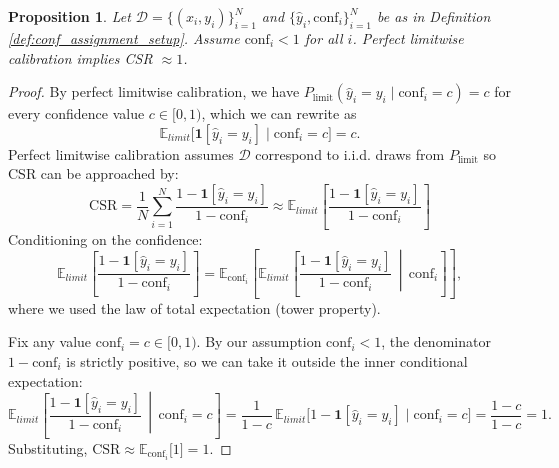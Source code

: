 \documentclass[10pt,a4paper]{amsart}
\newtheorem{theorem}{Proposition}
\begin{document}
\begin{theorem} \label{theorem:PerfectCal_is_CSR_one_limitwise}
Let $\mathcal{D} = \{(x_i, y_i)\}_{i=1}^N$ and $\{\hat{y}_i, \text{conf}_i\}_{i=1}^N$ be as in Definition \ref{def:conf_assignment_setup}. Assume $\text{conf}_i < 1$ for all $i$. Perfect limitwise calibration implies CSR $ \approx 1$.
\end{theorem}

\begin{proof}
By perfect limitwise calibration, we have $P_{\text{limit}}(\hat{y}_i = y_i \mid \text{conf}_i = c) = c$  for every confidence value $c \in [0,1)$, which we can rewrite as
\[
\mathbb{E}_{limit}\big[\mathbf{1}[\hat{y}_i = y_i] \mid \text{conf}_i = c\big] = c.
\]
Perfect limitwise calibration assumes $\mathcal{D}$ correspond to i.i.d. draws from $P_{\text{limit}}$ so CSR can be approached by:
\[
\text{CSR} = \frac{1}{N}\sum_{i=1}^N \frac{1 - \mathbf{1}[\hat{y}_i = y_i]}{1 - \text{conf}_i} \approx \mathbb{E}_{limit}\left[\frac{1 - \mathbf{1}[\hat{y}_i = y_i]}{1 - \text{conf}_i}\right] 
\]
Conditioning on the confidence:
\[
\mathbb{E}_{limit}\left[\frac{1 - \mathbf{1}[\hat{y}_i = y_i]}{1 - \text{conf}_i}\right] = \mathbb{E}_{\text{conf}_i}\left[   \mathbb{E}_{limit}\left[\frac{1 - \mathbf{1}[\hat{y}_i = y_i]}{1 - \text{conf}_i}  \,\middle|\, \text{conf}_i\right] \right],
\]
where we used the law of total expectation (tower property).

Fix any value $\text{conf}_i = c \in [0,1)$.
By our assumption $\text{conf}_i < 1$, the denominator $1 - \text{conf}_i$ is strictly positive, so we can take it outside the inner conditional expectation:
\[
\mathbb{E}_{limit}\left[\frac{1 - \mathbf{1}[\hat{y}_i = y_i]}{1 - \text{conf}_i}
\,\middle|\, \text{conf}_i = c\right]
= 
\frac{1}{1 - c}\,
\mathbb{E}_{limit}\big[1 - \mathbf{1}[\hat{y}_i = y_i] \mid \text{conf}_i = c\big]
= \frac{1 - c}{1 - c} = 1.
\]
Substituting, $\text{CSR} \approx \mathbb{E}_{\text{conf}_i}\big[1\big]= 1$.
\end{proof}
\end{document}
